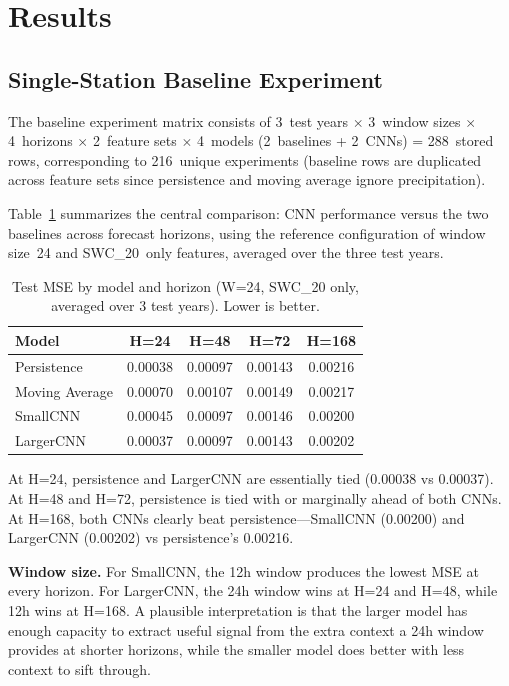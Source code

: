\documentclass[11pt]{article}
\begin{document}
\section{Results}

\subsection{Single-Station Baseline Experiment}

The baseline experiment matrix consists of 3~test years $\times$ 3~window sizes
$\times$ 4~horizons $\times$ 2~feature sets $\times$ 4~models (2~baselines +
2~CNNs) = 288~stored rows, corresponding to 216~unique experiments (baseline rows are
duplicated across feature sets since persistence and moving average ignore
precipitation).

Table~\ref{tab:baseline_horizon} summarizes the central comparison: CNN performance
versus the two baselines across forecast horizons, using the reference configuration
of window size~24 and SWC\_20~only features, averaged over the three test years.

\begin{table}[h]
\centering
\caption{Test MSE by model and horizon (W=24, SWC\_20 only, averaged over 3 test
years). Lower is better.}
\label{tab:baseline_horizon}
\begin{tabular}{lcccc}
\toprule
\textbf{Model} & \textbf{H=24} & \textbf{H=48} & \textbf{H=72} & \textbf{H=168} \\
\midrule
Persistence        & 0.00038 & 0.00097 & 0.00143 & 0.00216 \\
Moving Average     & 0.00070 & 0.00107 & 0.00149 & 0.00217 \\
SmallCNN           & 0.00045 & 0.00097 & 0.00146 & 0.00200 \\
LargerCNN          & 0.00037 & 0.00097 & 0.00143 & 0.00202 \\
\bottomrule
\end{tabular}
\end{table}

At H=24, persistence and LargerCNN are essentially tied (0.00038 vs 0.00037). At
H=48 and H=72, persistence is tied with or marginally ahead of both CNNs. At H=168,
both CNNs clearly beat persistence---SmallCNN (0.00200) and LargerCNN (0.00202) vs
persistence's 0.00216.

\textbf{Window size.} For SmallCNN, the 12h window produces the lowest MSE at every
horizon. For LargerCNN, the 24h window wins at H=24 and H=48, while 12h wins at
H=168. A plausible interpretation is that the larger model has enough capacity to
extract useful signal from the extra context a 24h window provides at shorter
horizons, while the smaller model does better with less context to sift through.
\end{document}
